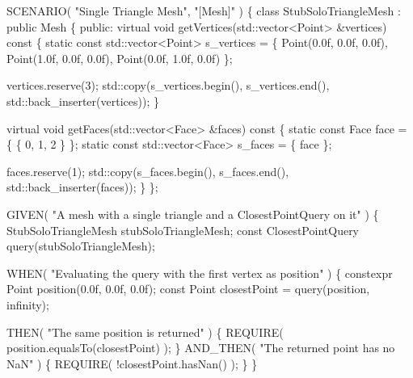 \begin{DoxyCodeInclude}
SCENARIO( \textcolor{stringliteral}{"Single Triangle Mesh"}, \textcolor{stringliteral}{"[Mesh]"} )
\{
    \textcolor{keyword}{class }StubSoloTriangleMesh : \textcolor{keyword}{public} Mesh
    \{
    \textcolor{keyword}{public}:
        \textcolor{keyword}{virtual} \textcolor{keywordtype}{void} getVertices(std::vector<Point> &vertices)\textcolor{keyword}{ const}
\textcolor{keyword}{        }\{
            \textcolor{keyword}{static} \textcolor{keyword}{const} std::vector<Point> s\_vertices = \{ Point(0.0f, 0.0f, 0.0f),
                                                           Point(1.0f, 0.0f, 0.0f),
                                                           Point(0.0f, 1.0f, 0.0f) \};

            vertices.reserve(3);
            std::copy(s\_vertices.begin(),
                      s\_vertices.end(),
                      std::back\_inserter(vertices));
        \}

        \textcolor{keyword}{virtual} \textcolor{keywordtype}{void} getFaces(std::vector<Face> &faces)\textcolor{keyword}{ const}
\textcolor{keyword}{        }\{
            \textcolor{keyword}{static} \textcolor{keyword}{const} Face face = \{ \{ 0, 1, 2 \}  \};
            \textcolor{keyword}{static} \textcolor{keyword}{const} std::vector<Face> s\_faces = \{ face \};

            faces.reserve(1);
            std::copy(s\_faces.begin(),
                      s\_faces.end(),
                      std::back\_inserter(faces));
        \}
    \};

    GIVEN( \textcolor{stringliteral}{"A mesh with a single triangle and a ClosestPointQuery on it"} )
    \{
        StubSoloTriangleMesh stubSoloTriangleMesh;
        \textcolor{keyword}{const} ClosestPointQuery query(stubSoloTriangleMesh);

        WHEN( \textcolor{stringliteral}{"Evaluating the query with the first vertex as position"} )
        \{
            constexpr Point position(0.0f, 0.0f, 0.0f);
            \textcolor{keyword}{const} Point closestPoint = query(position, infinity);

            THEN( \textcolor{stringliteral}{"The same position is returned"} )
            \{
                REQUIRE( position.equalsTo(closestPoint) );
            \}
            AND\_THEN( \textcolor{stringliteral}{"The returned point has no NaN"} )
            \{
                REQUIRE( !closestPoint.hasNan() );
            \}
        \}


\end{DoxyCodeInclude}
